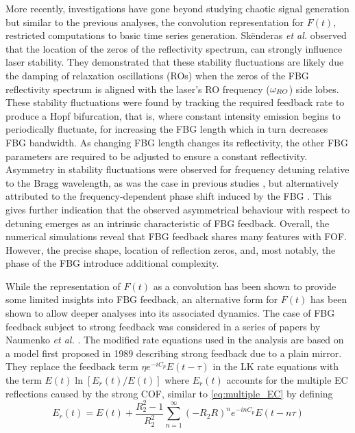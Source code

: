 More recently, investigations have gone beyond studying chaotic signal generation but similar to the previous analyses, the convolution representation for $F(t)$, restricted computations to basic time series generation. Sk\"enderas \textit{et al.} observed that the location of the zeros of the reflectivity spectrum, can strongly influence laser stability. They demonstrated that these stability fluctuations are likely due the damping of relaxation oscillations (ROs) when the zeros of the FBG reflectivity spectrum is aligned with the laser's RO frequency ($\omega_{RO}$) side lobes. These stability fluctuations were found by tracking the required feedback rate to produce a Hopf bifurcation, that is, where constant intensity emission begins to periodically fluctuate, for increasing the FBG length which in turn decreases FBG bandwidth. As changing FBG length changes its reflectivity, the other FBG parameters are required to be adjusted to ensure a constant reflectivity. Asymmetry in stability fluctuations were observed for frequency detuning relative to the Bragg wavelength, as was the case in previous studies \cite{li2012distributed}, but alternatively attributed to the frequency-dependent phase shift induced by the FBG \cite{skenderas2024impact, skenderas2021feedback}. This gives further indication that the observed asymmetrical behaviour with respect to detuning emerges as an intrinsic characteristic of FBG feedback. Overall, the numerical simulations reveal that FBG feedback shares many features with FOF. However, the precise shape, location of reflection zeros, and, most notably, the phase of the FBG introduce additional complexity. 
%
\par
%
While the representation of $F(t)$ as a convolution has been shown to provide some limited insights into FBG feedback, an alternative form for $F(t)$ has been shown to allow deeper analyses into its associated dynamics. The case of FBG feedback subject to strong feedback was considered in a series of papers by Naumenko \textit{et al.} \cite{naumenko2003characteristics, naumenko2004slow, besnard2002intensity}. The modified rate equations used in the analysis are based on a model first proposed in 1989 \cite{rong1989improved} describing strong feedback due to a plain mirror. They replace the feedback term $\eta e^{-i C_p} E(t-\tau)$ in the LK rate equations with the term $E(t) \ln{\left[ E_r(t) / E(t) \right]}$ where $E_r(t)$ accounts for the multiple EC reflections caused by the strong COF, similar to \eqref{eq:multiple_EC} by defining
%
\begin{equation*}
    E_r(t) = E(t) + \frac{R_2^2 - 1}{R_2^2} \sum_{n=1}^\infty (-R_2 R)^n e^{-i n C_p} E(t-n \tau)
\end{equation*}
